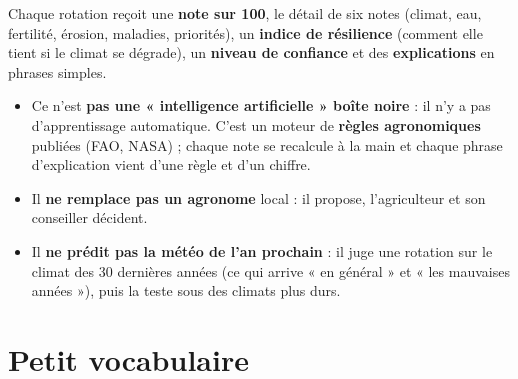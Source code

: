 \documentclass[11pt,a4paper]{article}
\begin{document}
Chaque rotation reçoit une \textbf{note sur 100}, le détail de six notes (climat, eau, fertilité, érosion,
maladies, priorités), un \textbf{indice de résilience} (comment elle tient si le climat se dégrade), un
\textbf{niveau de confiance} et des \textbf{explications} en phrases simples.

\begin{attention}
\begin{itemize}
\item Ce n'est \textbf{pas une « intelligence artificielle » boîte noire} : il n'y a pas d'apprentissage automatique.
C'est un moteur de \textbf{règles agronomiques} publiées (FAO, NASA) ; chaque note se recalcule à la main et chaque
phrase d'explication vient d'une règle et d'un chiffre.
\item Il \textbf{ne remplace pas un agronome} local : il propose, l'agriculteur et son conseiller décident.
\item Il \textbf{ne prédit pas la météo de l'an prochain} : il juge une rotation sur le climat des 30 dernières
années (ce qui arrive « en général » et « les mauvaises années »), puis la teste sous des climats plus durs.
\end{itemize}
\end{attention}

\section{Petit vocabulaire}
\end{document}
